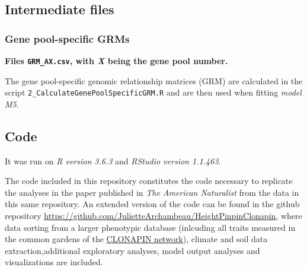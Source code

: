 \documentclass[]{article}
\begin{document}
\subsection{Intermediate files}\label{intermediate-files}

\subsubsection{Gene pool-specific GRMs}\label{gene-pool-specific-grms}

\textbf{Files \texttt{GRM\_AX.csv}, with \emph{X} being the gene pool
number.}

The gene pool-specific genomic relationship matrices (GRM) are
calculated in the script \texttt{2\_CalculateGenePoolSpecificGRM.R} and
are then used when fitting \emph{model M5}.

\subsection{Code}\label{code}

It was run on \emph{R version 3.6.3} and \emph{RStudio version 1.1.463}.

The code included in this repository constitutes the code necessary to
replicate the analyses in the paper published in \emph{The American
Naturalist} from the data in this same repository. An extended version
of the code can be found in the github repository
\url{https://github.com/JulietteArchambeau/HeightPinpinClonapin}, where
data sorting from a larger phenotypic database (inlcuding all traits
measured in the common gardens of the
\href{https://www6.bordeaux-aquitaine.inrae.fr/biogeco/Ressources/In-situ-dispositifs-de-terrain-observation-experimentation/Tests-de-provenances/CLONAPIN}{CLONAPIN
network}), climate and soil data extraction,additional exploratory
analyses, model output analyses and visualizations are included.
\end{document}
